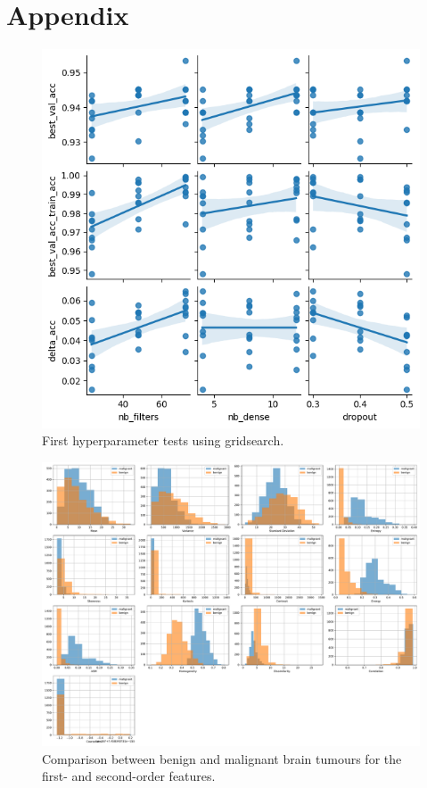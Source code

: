 \chapter{Appendix}
\label{cha:appendix}

\begin{figure}[H]
    \centering
    \includegraphics[width=.8\textwidth]{plots/FirstHyperparameterTests.png}
    \caption{First hyperparameter tests using gridsearch.}
    \label{fig:FirstHyperparameterTests}
\end{figure}

\begin{figure}[H]
    \centering
    \includegraphics[width=.8\textwidth]{plots/benign_malignant_comparison.pdf}
    \caption{Comparison between benign and malignant brain tumours for the first- and second-order features.}
    \label{fig:benign_malignant_comparison}
\end{figure}

